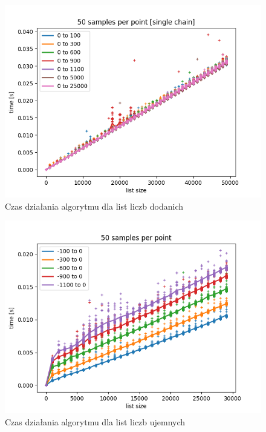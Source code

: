 \documentclass[11pt]{article} %
\begin{document}
\begin{figure}[h]
\caption{Czas działania algorytmu dla list liczb dodanich}
\label{rys1}
\centering
\includegraphics[scale=0.8]{50samples50000_0_25000}
\end{figure}

\begin{figure}[h]
\caption{Czas działania algorytmu dla list liczb ujemnych}
\label{rys2}
\centering
\includegraphics[scale=0.8]{50samples30000_-100_-1100}
\end{figure}
\end{document}
